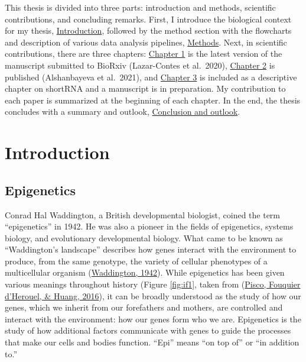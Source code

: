 \documentclass[12pt,twoside]{reedthesis}
\begin{document}
This thesis is divided into three parts: introduction and methods, scientific contributions, and concluding remarks. First, I introduce the biological context for my thesis, \protect\hyperlink{intro}{Introduction}, followed by the method section with the flowcharts and description of various data analysis pipelines, \protect\hyperlink{methods}{Methods}. Next, in scientific contributions, there are three chapters: \protect\hyperlink{chapter1}{Chapter 1} is the latest version of the manuscript submitted to BioRxiv (Lazar-Contes et al.~2020), \protect\hyperlink{chapter2}{Chapter 2} is published (Alshanbayeva et al.~2021), and \protect\hyperlink{chapter3}{Chapter 3} is included as a descriptive chapter on shortRNA and a manuscript is in preparation. My contribution to each paper is summarized at the beginning of each chapter. In the end, the thesis concludes with a summary and outlook, \protect\hyperlink{conclusion}{Conclusion and outlook}.

\FloatBarrier

\hypertarget{intro}{%
\chapter*{Introduction}\label{intro}}

\hypertarget{epigenetics}{%
\section*{Epigenetics}\label{epigenetics}}

Conrad Hal Waddington, a British developmental biologist, coined the
term ``epigenetics'' in 1942. He was also a pioneer in the fields of
epigenetics, systems biology, and evolutionary developmental biology.
What came to be known as ``Waddington's landscape'' describes how genes
interact with the environment to produce, from the same genotype, the
variety of cellular phenotypes of a multicellular organism
(\protect\hyperlink{ref-waddington_1942}{Waddington, 1942}). While epigenetics has been given various meanings
throughout history (Figure \ref{fig:if1}, taken from (\protect\hyperlink{ref-pisco2016}{Pisco, Fouquier d'Herouel, \& Huang, 2016}), it
can be broadly understood as the study of how our genes, which we
inherit from our forefathers and mothers, are controlled and interact
with the environment: how our genes form who we are. Epigenetics is the
study of how additional factors communicate with genes to guide the
processes that make our cells and bodies function. ``Epi'' means ``on top
of'' or ``in addition to.''
\end{document}
